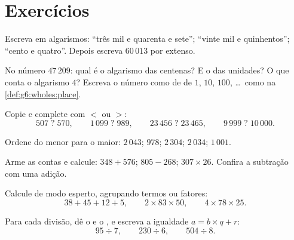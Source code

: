 \section{Exercícios}

\begin{exercise}[$\star$]\label{exo:g6:wholes:1}
Escreva em algarismos: ``três mil e quarenta e sete''; ``vinte mil e
quinhentos''; ``cento e quatro''. Depois escreva $60\,013$ por extenso.
\end{exercise}

\begin{exercise}[$\star$]\label{exo:g6:wholes:2}
No número $47\,209$: qual é o algarismo das centenas? E o das unidades? O
que conta o algarismo $4$? Escreva o número como  de  de
$1$, $10$, $100$, \dots\ como na
\cref{def:g6:wholes:place}.
\end{exercise}

\begin{exercise}[$\star$]\label{exo:g6:wholes:3}
Copie e complete com $<$ ou $>$:
\[
507 \;?\; 570, \qquad
1\,099 \;?\; 989, \qquad
23\,456 \;?\; 23\,465, \qquad
9\,999 \;?\; 10\,000 .
\]
\end{exercise}

\begin{exercise}[$\star$]\label{exo:g6:wholes:4}
Ordene do menor para o maior: $2\,043$; $978$; $2\,304$; $2\,034$;
$1\,001$.
\end{exercise}

\begin{exercise}[$\star$]\label{exo:g6:wholes:5}
Arme as contas e calcule: $348 + 576$; \quad $805 - 268$; \quad
$307 \times 26$. Confira a subtração com uma adição.
\end{exercise}

\begin{exercise}[$\star$]\label{exo:g6:wholes:6}
Calcule de modo esperto, agrupando termos ou fatores:
\[
38 + 45 + 12 + 5, \qquad
2 \times 83 \times 50, \qquad
4 \times 78 \times 25 .
\]
\end{exercise}

\begin{exercise}[$\star$]\label{exo:g6:wholes:7}
Para cada divisão, dê o  e o , e escreva a igualdade
$a = b \times q + r$:
\[
95 \div 7, \qquad
230 \div 6, \qquad
504 \div 8 .
\]
\end{exercise}

